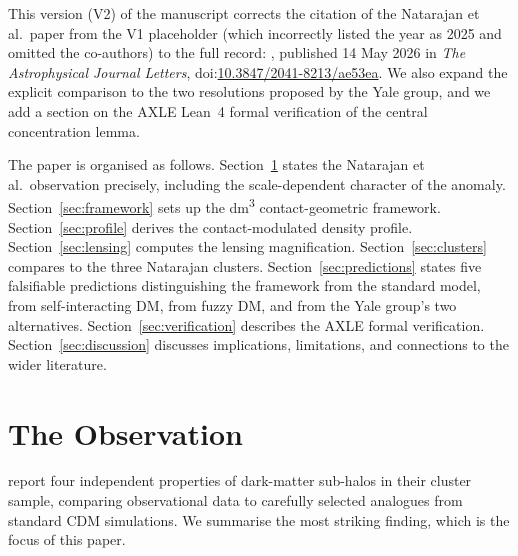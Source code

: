 \documentclass[11pt,a4paper]{article}
\theoremstyle{definition}
\theoremstyle{remark}
\begin{document}
This version (V2) of the manuscript corrects the citation of the Natarajan et al.\ paper from the V1 placeholder (which incorrectly listed the year as 2025 and omitted the co-authors) to the full record: \citet{NatarajanChiangDutra2026}, published 14 May 2026 in \emph{The Astrophysical Journal Letters}, doi:\href{https://doi.org/10.3847/2041-8213/ae53ea}{10.3847/2041-8213/ae53ea}. We also expand the explicit comparison to the two resolutions proposed by the Yale group, and we add a section on the AXLE Lean~4 formal verification of the central concentration lemma.

The paper is organised as follows. Section~\ref{sec:observation} states the Natarajan et al.\ observation precisely, including the scale-dependent character of the anomaly. Section~\ref{sec:framework} sets up the dm\textsuperscript{3} contact-geometric framework. Section~\ref{sec:profile} derives the contact-modulated density profile. Section~\ref{sec:lensing} computes the lensing magnification. Section~\ref{sec:clusters} compares to the three Natarajan clusters. Section~\ref{sec:predictions} states five falsifiable predictions distinguishing the framework from the standard model, from self-interacting DM, from fuzzy DM, and from the Yale group's two alternatives. Section~\ref{sec:verification} describes the AXLE formal verification. Section~\ref{sec:discussion} discusses implications, limitations, and connections to the wider literature.

\section{The Observation}
\label{sec:observation}

\citet{NatarajanChiangDutra2026} report four independent properties of dark-matter sub-halos in their cluster sample, comparing observational data to carefully selected analogues from standard CDM simulations. We summarise the most striking finding, which is the focus of this paper.
\end{document}
